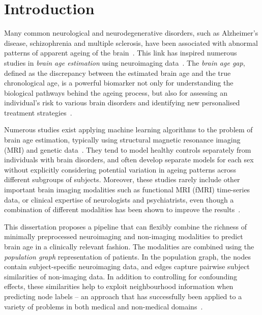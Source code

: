 \chapter{Introduction}



Many common neurological and neurodegenerative disorders, such as Alzheimer’s disease, schizophrenia and multiple sclerosis, have been associated with abnormal patterns of apparent ageing of the brain~\cite{kaufmann2019}. This link has inspired numerous studies in \textit{brain age estimation} using neuroimaging data~\cite{franke2019ten}. The \textit{brain age gap}, defined as the discrepancy between the estimated brain age and the true chronological age, is a powerful biomarker not only for understanding the biological pathways behind the ageing process, but also for assessing an individual’s risk to various brain disorders and identifying new personalised treatment strategies~\cite{tuncc2019deviation}.

Numerous studies exist applying machine learning algorithms to the problem of brain age estimation, typically using structural magnetic resonance imaging (MRI) and genetic data~\cite{franke2019ten}. They tend to model healthy controls separately from individuals with brain disorders, and often develop separate models for each sex~\cite{kaufmann2019,niu2019improved} without explicitly considering potential variation in ageing patterns across different subgroups of subjects. Moreover, these studies rarely include other important brain imaging modalities such as functional MRI (fMRI) time-series data, or clinical expertise of neurologists and psychiatrists, even though a combination of different modalities has been shown to improve the results~\cite{niu2019improved}. 

This dissertation proposes a pipeline that can flexibly combine the richness of minimally preprocessed neuroimaging and non-imaging modalities to predict brain age in a clinically relevant fashion. The modalities are combined using the \textit{population graph} representation of patients. In the population graph, the nodes contain subject-specific neuroimaging data, and edges capture pairwise subject similarities of non-imaging data. In addition to controlling for confounding effects, these similarities help to exploit neighbourhood information when predicting node labels – an approach that has successfully been applied to a variety of problems in both medical and non-medical domains~\cite{parisot2018disease, tong2017multi, wang2017multi}. 

